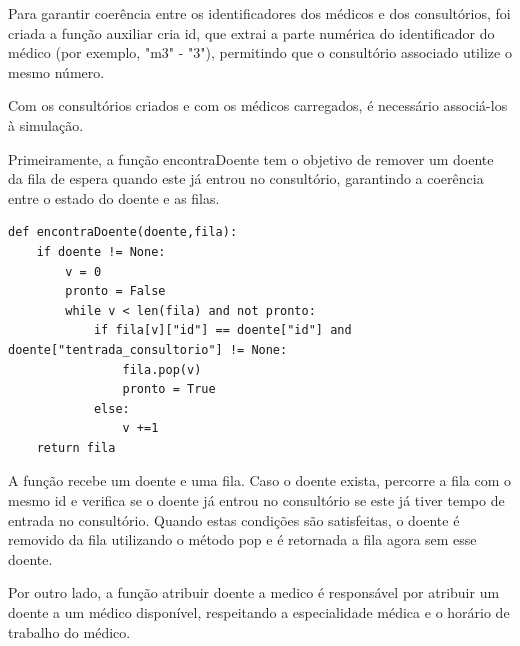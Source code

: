 \documentclass[12pt,a4paper]{article} %
\begin{document}
    Para garantir coerência entre os identificadores dos médicos e dos consultórios, foi criada a função auxiliar cria id, que extrai a parte numérica do identificador do médico (por exemplo, "m3" - "3"), permitindo que o consultório associado utilize o mesmo número.

    Com os consultórios criados e com os médicos carregados, é necessário associá-los à simulação. 

    Primeiramente, a função encontraDoente tem o objetivo de remover um doente da fila de espera quando este já entrou no consultório, garantindo a coerência entre o estado do doente e as filas.

\begin{verbatim}
def encontraDoente(doente,fila):
    if doente != None:
        v = 0
        pronto = False
        while v < len(fila) and not pronto:
            if fila[v]["id"] == doente["id"] and doente["tentrada_consultorio"] != None:
                fila.pop(v)
                pronto = True
            else:
                v +=1
    return fila
\end{verbatim}

    A função recebe um doente e uma fila. Caso o doente exista, percorre a fila com o mesmo id e verifica se o doente já entrou no consultório se este já tiver tempo de entrada no consultório. Quando estas condições são satisfeitas, o doente é removido da fila utilizando o método pop e é retornada a fila agora sem esse doente. 

    \medskip
    Por outro lado, a função atribuir doente a medico é responsável por atribuir um doente a um médico disponível, respeitando a especialidade médica e o horário de trabalho do médico.
\end{document}
